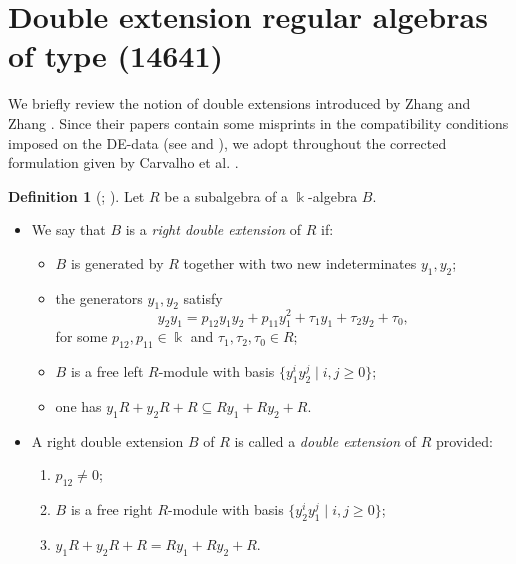 \documentclass{amsart}
\theoremstyle{definition}
\newtheorem{definition}[theorem]{Definition}
\theoremstyle{remark}
\numberwithin{equation}{section}
\begin{document}
\section{Double extension regular algebras of type (14641)}\label{DAPreliminaries}

We briefly review the notion of double extensions introduced by Zhang and Zhang \cite{ZhangZhang2008}. Since their papers contain some misprints in the compatibility conditions imposed on the DE-data (see \cite[p. 2674]{ZhangZhang2008} and \cite[p. 379]{ZhangZhang2009}), we adopt throughout the corrected formulation given by Carvalho et al. \cite{Carvalhoetal2011}.

\begin{definition}[{\cite[Definition 1.3]{ZhangZhang2008}; \cite[Definition 1.1]{Carvalhoetal2011}}]\label{DoubleOreDefinition}
Let $R$ be a subalgebra of a $\Bbbk$-algebra $B$.
\begin{itemize}
    \item[\rm (a)] We say that $B$ is a \emph{right double extension} of $R$ if:
    \begin{itemize}
        \item[\rm (i)] $B$ is generated by $R$ together with two new indeterminates $y_1,y_2$;
        \item[\rm (ii)] the generators $y_1,y_2$ satisfy
        \begin{equation}\label{Carvalhoetal2011(1.I)}
        y_2y_1 = p_{12}y_1y_2 + p_{11}y_1^2 + \tau_1y_1 + \tau_2y_2 + \tau_0,
        \end{equation}
        for some $p_{12}, p_{11} \in \Bbbk$ and $\tau_1, \tau_2, \tau_0 \in R$;
        \item[\rm (iii)] $B$ is a free left $R$-module with basis $\{y_1^{i}y_2^{j} \mid i,j \ge 0\}$;
        \item[\rm (iv)] one has $y_1R+y_2R+R\subseteq Ry_1+Ry_2+R$.
    \end{itemize}
    \item[\rm (b)] A right double extension $B$ of $R$ is called a \emph{double extension} of $R$ provided:
    \begin{enumerate}
        \item[\rm (i)] $p_{12}\neq 0$;
        \item[\rm (ii)] $B$ is a free right $R$-module with basis $\{y_2^{i}y_1^{j}\mid i,j\ge 0\}$;
        \item[\rm (iii)] $y_1R+y_2R+R = Ry_1+Ry_2+R$.
    \end{enumerate}
\end{itemize}
\end{definition}
\end{document}
